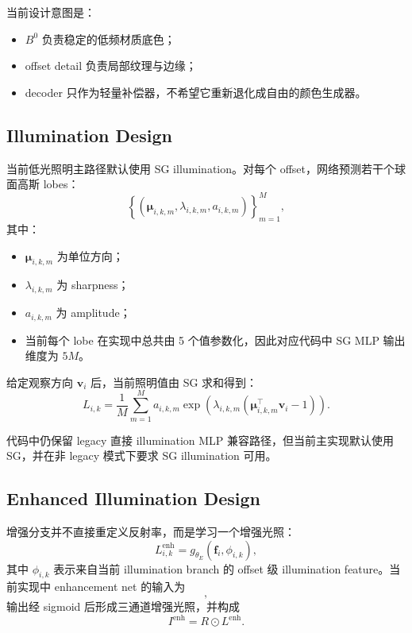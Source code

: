 \documentclass[11pt]{article}
\begin{document}
当前设计意图是：
\begin{itemize}[leftmargin=1.5em]
    \item $B^0$ 负责稳定的低频材质底色；
    \item offset detail 负责局部纹理与边缘；
    \item decoder 只作为轻量补偿器，不希望它重新退化成自由的颜色生成器。
\end{itemize}

\subsection{Illumination Design}

当前低光照明主路径默认使用 SG illumination。对每个 offset，网络预测若干个球面高斯 lobes：
\begin{equation}
    \left\{
        (\bm{\mu}_{i,k,m}, \lambda_{i,k,m}, a_{i,k,m})
    \right\}_{m=1}^{M},
\end{equation}
其中：
\begin{itemize}[leftmargin=1.5em]
    \item $\bm{\mu}_{i,k,m}$ 为单位方向；
    \item $\lambda_{i,k,m}$ 为 sharpness；
    \item $a_{i,k,m}$ 为 amplitude；
    \item 当前每个 lobe 在实现中总共由 5 个值参数化，因此对应代码中 SG MLP 输出维度为 $5M$。
\end{itemize}

给定观察方向 $\bm{v}_i$ 后，当前照明值由 SG 求和得到：
\begin{equation}
    L_{i,k}
    =
    \frac{1}{M}
    \sum_{m=1}^{M}
    a_{i,k,m}
    \exp\left(
        \lambda_{i,k,m}
        \left(\bm{\mu}_{i,k,m}^{\top}\bm{v}_i - 1\right)
    \right).
\end{equation}

代码中仍保留 legacy 直接 illumination MLP 兼容路径，但当前主实现默认使用 SG，并在非 legacy 模式下要求 SG illumination 可用。

\subsection{Enhanced Illumination Design}

增强分支并不直接重定义反射率，而是学习一个增强光照：
\begin{equation}
    L^{\text{enh}}_{i,k}
    =
    g_{\theta_E}(\mathbf{f}_i, \phi_{i,k}),
\end{equation}
其中 $\phi_{i,k}$ 表示来自当前 illumination branch 的 offset 级 illumination feature。当前实现中 enhancement net 的输入为
\begin{equation}
    [\mathrm{stopgrad}(\mathbf{f}_i), \mathrm{stopgrad}(\phi_{i,k})],
\end{equation}
输出经 sigmoid 后形成三通道增强光照，并构成
\begin{equation}
    I^{\text{enh}} = R \odot L^{\text{enh}}.
\end{equation}
\end{document}
